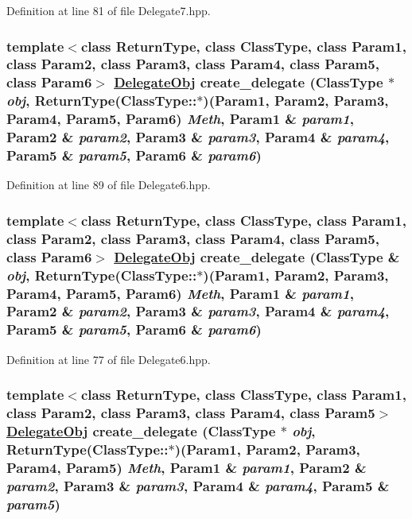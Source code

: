 Definition at line 81 of file Delegate7.hpp.\hypertarget{namespaceDL_a16}{
\subsubsection[create\_\-delegate]{\setlength{\rightskip}{0pt plus 5cm}template$<$class Return\-Type, class Class\-Type, class Param1, class Param2, class Param3, class Param4, class Param5, class Param6$>$ \hyperlink{namespaceDL_a0}{Delegate\-Obj} create\_\-delegate (Class\-Type $\ast$ {\em obj}, Return\-Type(Class\-Type::$\ast$)(Param1, Param2, Param3, Param4, Param5, Param6) {\em Meth}, Param1 \& {\em param1}, Param2 \& {\em param2}, Param3 \& {\em param3}, Param4 \& {\em param4}, Param5 \& {\em param5}, Param6 \& {\em param6})}}
\label{namespaceDL_a16}




Definition at line 89 of file Delegate6.hpp.\hypertarget{namespaceDL_a15}{
\subsubsection[create\_\-delegate]{\setlength{\rightskip}{0pt plus 5cm}template$<$class Return\-Type, class Class\-Type, class Param1, class Param2, class Param3, class Param4, class Param5, class Param6$>$ \hyperlink{namespaceDL_a0}{Delegate\-Obj} create\_\-delegate (Class\-Type \& {\em obj}, Return\-Type(Class\-Type::$\ast$)(Param1, Param2, Param3, Param4, Param5, Param6) {\em Meth}, Param1 \& {\em param1}, Param2 \& {\em param2}, Param3 \& {\em param3}, Param4 \& {\em param4}, Param5 \& {\em param5}, Param6 \& {\em param6})}}
\label{namespaceDL_a15}




Definition at line 77 of file Delegate6.hpp.\hypertarget{namespaceDL_a14}{
\subsubsection[create\_\-delegate]{\setlength{\rightskip}{0pt plus 5cm}template$<$class Return\-Type, class Class\-Type, class Param1, class Param2, class Param3, class Param4, class Param5$>$ \hyperlink{namespaceDL_a0}{Delegate\-Obj} create\_\-delegate (Class\-Type $\ast$ {\em obj}, Return\-Type(Class\-Type::$\ast$)(Param1, Param2, Param3, Param4, Param5) {\em Meth}, Param1 \& {\em param1}, Param2 \& {\em param2}, Param3 \& {\em param3}, Param4 \& {\em param4}, Param5 \& {\em param5})}}
\label{namespaceDL_a14}




